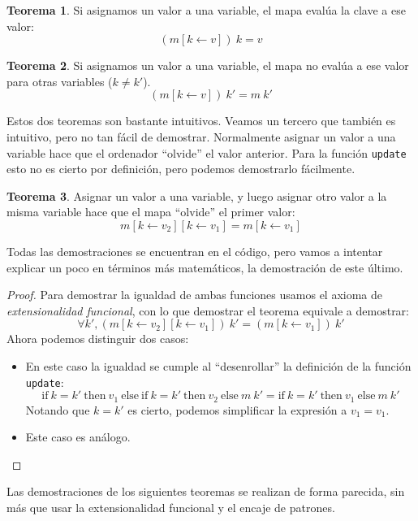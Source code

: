 \documentclass[
  a4paper, 
  10pt, 
  parskip=half, 
  toc=bibliography,
]{scrbook}
\theoremstyle{definition}
\theoremstyle{bolddef}
\newtheorem{theorem}{Teorema}[section]
\newcommand{\funfont}[1]{\texttt{#1}}
\newcommand{\LeanIfElse}[3]{\text{if} \ {#1} \ \text{then} \ {#2} \ \text{else} \ {#3}}
\begin{document}
\begin{theorem}
  Si asignamos un valor a una variable, el mapa evalúa la clave a ese valor:
  \[
  (m[k \leftarrow v]) \ k = v
  \]
\end{theorem}

\begin{theorem}
  Si asignamos un valor a una variable, el mapa no evalúa a ese valor para
  otras variables (\(k \neq k'\)).
  \[
  (m[k \leftarrow v]) \ k' = m \ k'
  \]
\end{theorem}

Estos dos teoremas son bastante intuitivos. Veamos un tercero que también
es intuitivo, pero no tan fácil de demostrar. Normalmente asignar un valor a una
variable hace que el ordenador \enquote{olvide} el valor anterior. Para la
función \funfont{update} esto no es cierto por definición, pero podemos
demostrarlo fácilmente.
\begin{theorem}
  Asignar un valor a una variable, y luego asignar otro valor a la misma
  variable hace que el mapa \enquote{olvide} el primer valor:
  \[
  m[k \leftarrow v_2][k \leftarrow v_1] = m[k \leftarrow v_1]
  \]
\end{theorem}

Todas las demostraciones se encuentran en el código, pero vamos a intentar 
explicar un poco en términos más matemáticos, la demostración de este último.
\begin{proof}
  Para demostrar la igualdad de ambas funciones usamos el axioma de
  \emph{extensionalidad funcional}, con lo que demostrar el teorema equivale 
  a demostrar:
  \[
  \forall k' , (m[k \leftarrow v_2][k \leftarrow v_1]) \ k' = (m[k \leftarrow v_1]) \ k'
  \]
  Ahora podemos distinguir dos casos:
  \begin{itemize}
    \item[(\(k = k'\))] 
      En este caso la igualdad se cumple al \enquote{desenrollar} la
      definición de la función \funfont{update}:
      \[
        \LeanIfElse{k = k'}{v_1}{\LeanIfElse{k = k'}{v_2}{m \ k'}} =
        \LeanIfElse{k = k'}{v_1}{m \ k'}
      \]
      Notando que \(k = k'\) es cierto, podemos simplificar la expresión a \(v_1 = v_1\).
    \item[(\(k \neq k'\))] Este caso es análogo.
  \end{itemize}
\end{proof}

Las demostraciones de los siguientes teoremas se realizan de forma parecida,
sin más que usar la extensionalidad funcional y el encaje de patrones.
\end{document}
